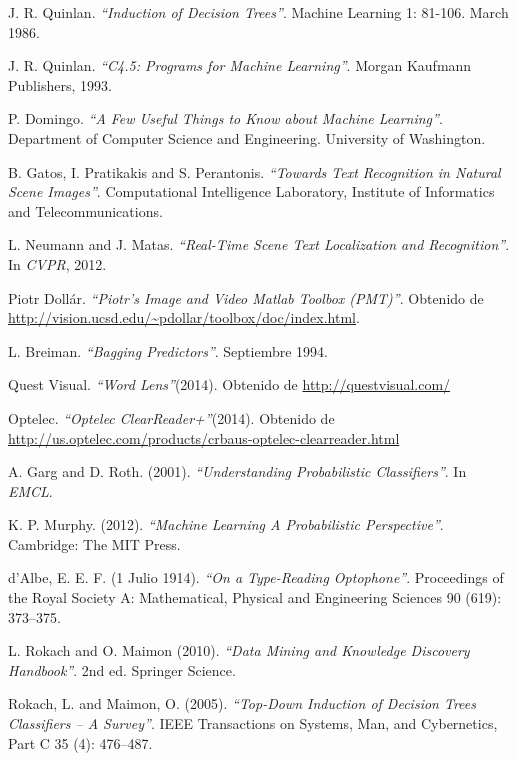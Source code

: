 \begin{thebibliography}{100}
		J. R. Quinlan.
		\emph{``Induction of Decision Trees''}.
		Machine Learning 1: 81-106.
		March 1986.
		
		J. R. Quinlan.
		\emph{``C4.5: Programs for Machine Learning''}.
		Morgan Kaufmann Publishers, 1993.
		
		P. Domingo.
		\emph{``A Few Useful Things to Know about Machine Learning''}.
		Department of Computer Science and Engineering.
		University of Washington.
		
		B. Gatos, I. Pratikakis and S. Perantonis.
		\emph{``Towards Text Recognition in Natural Scene Images''}.
		Computational Intelligence Laboratory, Institute of Informatics and Telecommunications.
		
		L. Neumann and J. Matas.
		\emph{``Real-Time Scene Text Localization and Recognition''}.
		In \textit{CVPR}, 2012.
		
		Piotr Dollár.
		\emph{``Piotr's Image and Video Matlab Toolbox (PMT)''}.
		Obtenido de \url{http://vision.ucsd.edu/~pdollar/toolbox/doc/index.html}. 
		
		L. Breiman.
		\emph{``Bagging Predictors''}.
		Septiembre 1994.
		
		Quest Visual.
		\emph{``Word Lens''}(2014).
		Obtenido de \url{http://questvisual.com/}

		Optelec.
		\emph{``Optelec ClearReader+''}(2014).
		Obtenido de \url{http://us.optelec.com/products/crbaus-optelec-clearreader.html}	
		
		A. Garg and D. Roth. (2001).
		\emph{``Understanding Probabilistic Classifiers''}.
		In \textit{EMCL}.
		
		K. P. Murphy. (2012).
		\emph{``Machine Learning A Probabilistic Perspective''}.
		Cambridge: The MIT Press.
		
		d'Albe, E. E. F. (1 Julio 1914).
		\emph{``On a Type-Reading Optophone''}.
		Proceedings of the Royal Society A: Mathematical, Physical and Engineering Sciences 90 (619): 373–375.
		
		L. Rokach and O. Maimon (2010).
		\emph{``Data Mining and Knowledge Discovery Handbook''}.
		2nd ed. Springer Science.
		
		Rokach, L. and Maimon, O. (2005).
		\emph{``Top-Down Induction of Decision Trees Classifiers –
A Survey''}.
 		IEEE Transactions on Systems, Man, and Cybernetics, Part C 35 (4): 476–487.
 		

\end{thebibliography}
